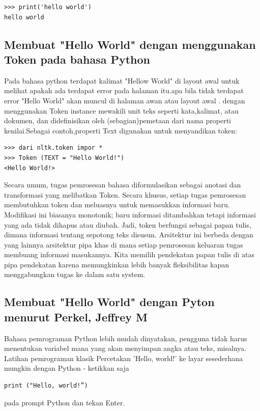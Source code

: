 \documentclass[12pt]{article}
\begin{document}
\begin{verbatim}
>>> print('hello world')
hello world
\end{verbatim}

\subsection{Membuat "Hello World" dengan menggunakan Token pada bahasa Python}
Pada bahasa python terdapat kalimat "Hellow World" di layout awal untuk melihat apakah ada terdapat error pada halaman itu.apa bila tidak terdapat error "Hello World" akan muncul di halaman awan atau layout awal . dengan menggunakan Token instance mewakili unit teks seperti kata,kalimat, atau dokumen, dan didefinisikan oleh (sebagian)pemetaan dari nama properti kenilai.Sebagai contoh,properti Text digunakan untuk menyandikan token\cite{bird2004nltk}:

\begin{verbatim}
>>> dari nltk.token impor *
>>> Token (TEXT = "Hello World!")
<Hello World!>
\end{verbatim}

Secara umum, tugas pemrosesan bahasa diformulasikan sebagai anotasi dan transformasi yang melibatkan Token. Secara khusus, setiap tugas pemrosesan membutuhkan token dan meluasnya untuk memasukkan informasi baru. Modifikasi ini biasanya monotonik; baru informasi ditambahkan tetapi informasi yang ada tidak dihapus atau diubah. Jadi, token berfungsi sebagai papan tulis, dimana informasi tentang sepotong teks disusun. Arsitektur ini berbeda dengan yang lainnya arsitektur pipa khas di mana setiap pemrosesan keluaran tugas membuang informasi masukannya. Kita memilih pendekatan papan tulis di atas pipa pendekatan karena memungkinkan lebih banyak fleksibilitas kapan menggabungkan tugas ke dalam satu system\cite{bird2004nltk}.

\subsection{Membuat "Hello World" dengan Pyton menurut Perkel, Jeffrey M}
Bahasa pemrograman Python lebih mudah dinyatakan, pengguna tidak harus menentukan variabel mana yang akan menyimpan angka atau teks, misalnya. Latihan pemrograman klasik Percetakan 'Hello, world!' ke layar sesederhana mungkin dengan Python - ketikkan saja

\begin{verbatim}
print ("Hello, world!”)
\end{verbatim}
pada prompt Python dan tekan Enter\cite{perkel2015programming}.
\end{document}
